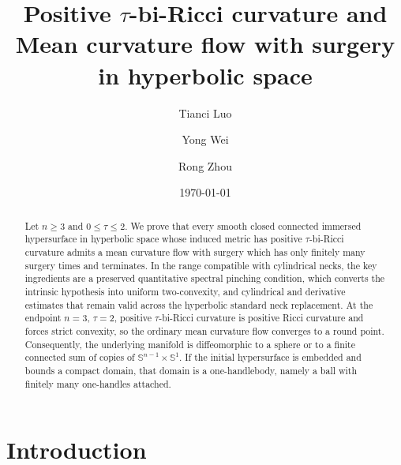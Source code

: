 \documentclass[11pt,reqno]{amsart}
\author[T. Luo]{Tianci Luo}
\author[Y. Wei]{Yong Wei}
\author[R. Zhou]{Rong Zhou}
\date{\today}
\theoremstyle{definition}
\theoremstyle{remark}
\numberwithin{equation}{section}
\newcommand{\Sph}{\mathbb S}
\begin{document}
\title[\texorpdfstring{$\tau$}{tau}-bi-Ricci curvature and MCF surgery]{Positive \texorpdfstring{$\tau$}{tau}-bi-Ricci curvature and Mean curvature flow with surgery in hyperbolic space}


\begin{abstract}
Let $n\geq3$ and $0\leq\tau\leq2$.  We prove that every smooth closed
connected immersed hypersurface in hyperbolic space whose induced metric has
positive $\tau$-bi-Ricci curvature admits a mean curvature flow with surgery
which has only finitely many surgery times and terminates.
In the range compatible with cylindrical necks, the key ingredients are a
preserved quantitative spectral pinching condition, which converts the
intrinsic hypothesis into uniform two-convexity, and cylindrical and
derivative estimates that remain valid across the hyperbolic standard neck
replacement.  At the endpoint $n=3$, $\tau=2$, positive $\tau$-bi-Ricci
curvature is positive Ricci curvature and forces strict convexity, so the
ordinary mean curvature flow converges to a round point.  Consequently, the
underlying manifold is diffeomorphic to a sphere or to a finite connected sum
of copies of $\Sph^{n-1}\times\Sph^1$.  If the initial hypersurface is embedded
and bounds a compact domain, that domain is a one-handlebody, namely a ball
with finitely many one-handles attached.
\end{abstract}

\maketitle
\setcounter{tocdepth}{1}
\tableofcontents

\section{Introduction}
\end{document}
